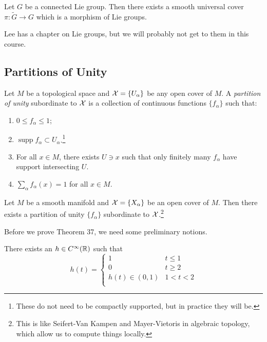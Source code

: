 \documentclass[twoside, 10pt]{article}
\begin{document}
    \begin{thm} Let $G$ be a connected Lie group. Then there exists a smooth
    universal cover $\pi: \widetilde{G} \to G$ which is a morphism of Lie
groups.  \end{thm}

    \begin{rmk} Lee has a chapter on Lie groups, but we will probably not get
    to them in this course.  \end{rmk}

    \subsection{Partitions of Unity}%
    
    

    \begin{defn} Let $M$ be a topological space and $\mathcal{X} = \{U_{\alpha}\}$
        be any open cover of $M$. A \textit{partition of unity} subordinate to
        $\mathcal{X}$ is a collection of continuous functions $\{f_{\alpha}\}$ such
        that: \begin{enumerate} \item $0 \leq f_{\alpha} \leq 1$; \item
            $\operatorname{supp} f_{\alpha} \subset U_{\alpha}$.\footnote{These
            do not need to be compactly supported, but in practice they will
        be.} \item For all $x \in M$, there exists $U \ni x$ such that only
        finitely many $f_{\alpha}$ have support intersecting $U$.  \item
$\sum_{\alpha} f_{\alpha}(x) = 1$ for all $x \in M$.  \end{enumerate}
\end{defn}

    \begin{thm} Let $M$ be a smooth manifold and $\mathcal{X} = \{X_{\alpha}\}$ be
        an open cover of $M$. Then there exists a partition of unity
        $\{f_{\alpha}\}$ subordinate to $\mathcal{X}$.\footnote{This is like
        Seifert-Van Kampen and Mayer-Vietoris in algebraic topology, which
    allow us to compute things locally.} \end{thm}

    Before we prove Theorem 37, we need some preliminary notions.

    \begin{lem} There exists an $h \in C^{\infty}(\mathbb{R})$ such that \[h(t) =
        \begin{cases} 1 & t \leq 1 \\ 0 & t \geq 2 \\ h(t) \in (0,1) & 1 < t <
        2 \\ \end{cases} \] \end{lem}
\end{document}
